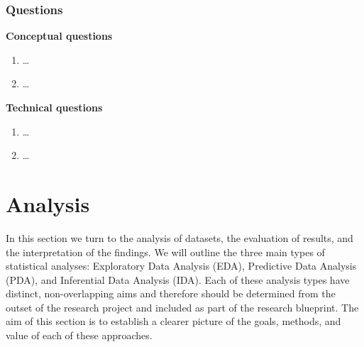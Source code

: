 \documentclass[
  letterpaper,
  DIV=11,
  numbers=noendperiod]{scrreport}
\providecommand{\tightlist}{%
  \setlength{\itemsep}{0pt}\setlength{\parskip}{0pt}}\usepackage{longtable,booktabs,array}
\theoremstyle{definition}
\theoremstyle{remark}
\begin{document}
\hypertarget{questions-6}{%
\section*{Questions}\label{questions-6}}


\begin{tcolorbox}[enhanced jigsaw, leftrule=.75mm, bottomrule=.15mm, opacityback=0, breakable, left=2mm, colback=white, toprule=.15mm, arc=.35mm, rightrule=.15mm]

 \textbf{Conceptual questions}

\begin{enumerate}
\def\labelenumi{\arabic{enumi}.}
\tightlist
\item
  \ldots{}
\item
  \ldots{}
\end{enumerate}

\end{tcolorbox}

\begin{tcolorbox}[enhanced jigsaw, leftrule=.75mm, bottomrule=.15mm, opacityback=0, breakable, left=2mm, colback=white, toprule=.15mm, arc=.35mm, rightrule=.15mm]

 \textbf{Technical questions}

\begin{enumerate}
\def\labelenumi{\arabic{enumi}.}
\tightlist
\item
  \ldots{}
\item
  \ldots{}
\end{enumerate}

\end{tcolorbox}

\part{Analysis}

In this section we turn to the analysis of datasets, the evaluation of
results, and the interpretation of the findings. We will outline the
three main types of statistical analyses: Exploratory Data Analysis
(EDA), Predictive Data Analysis (PDA), and Inferential Data Analysis
(IDA). Each of these analysis types have distinct, non-overlapping aims
and therefore should be determined from the outset of the research
project and included as part of the research blueprint. The aim of this
section is to establish a clearer picture of the goals, methods, and
value of each of these approaches.
\end{document}
